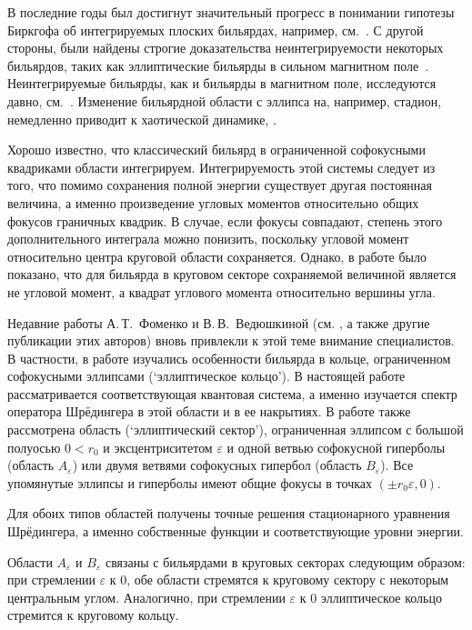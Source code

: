 
{\actuality} 
В последние годы был достигнут значительный прогресс в понимании гипотезы Биркгофа об интегрируемых плоских бильярдах, например, см.~\cite{bm2022}.
С другой стороны, были найдены строгие доказательства неинтегрируемости некоторых бильярдов, таких как эллиптические бильярды в сильном магнитном поле~\cite{bm2020, bm2019}. Неинтегрируемые бильярды, как и бильярды в магнитном поле, исследуются давно, см.~\cite{berry1985, berry1986}.
Изменение бильярдной области с эллипса на, например, стадион, немедленно приводит к хаотической динамике, \cite{bunimovich1974, stockmann2000}.

Хорошо известно, что классический бильярд в ограниченной софокусными квадриками области интегрируем. Интегрируемость  этой системы следует из того, что помимо сохранения полной энергии существует другая постоянная величина, а именно произведение угловых моментов относительно общих фокусов граничных квадрик.
В случае, если фокусы совпадают, степень этого дополнительного интеграла можно понизить, поскольку угловой момент относительно центра круговой области сохраняется.
Однако, в работе \cite{wref13} было показано, что для бильярда в круговом секторе сохраняемой величиной является не  угловой момент, а квадрат углового момента относительно вершины угла.


Недавние работы А.\,Т.~Фоменко и В.\,В.~Ведюшкиной (см. \cite{wref6,wref7,wref8} , а также другие публикации этих авторов) вновь привлекли к этой теме внимание специалистов. 
В частности, в работе \cite{wref6} изучались особенности бильярда в кольце, ограниченном софокусными эллипсами (`эллиптическое кольцо'). В настоящей работе рассматривается соответствующая квантовая система, а именно изучается спектр оператора Шрёдингера в этой области и в ее накрытиях. 
В работе также рассмотрена область (`эллиптический сектор'), ограниченная эллипсом с большой полуосью $0 <r_0$ и эксцентриситетом $\varepsilon$ и 
одной ветвью софокусной гиперболы  (область $A_\varepsilon$)
или двумя ветвями софокусных гипербол (область $B_\varepsilon$).
Все упомянутые эллипсы и гиперболы имеют общие фокусы в точках $(\pm r_0\varepsilon, 0)$.

Для обоих типов областей получены точные решения стационарного уравнения Шрёдингера, а именно собственные функции и соответствующие уровни энергии.

Области $A_\varepsilon$ и $B_\varepsilon$ связаны с бильярдами в круговых секторах следующим образом: при стремлении $\varepsilon$ к 0, обе области стремятся к круговому сектору с некоторым центральным углом. Аналогично, при стремлении $\varepsilon$ к 0 эллиптическое кольцо стремится к круговому кольцу. 

